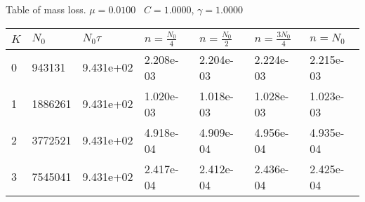 \begin{center}
Table of mass loss. $\mu = 0.0100$ \, $C = 1.0000$, $\gamma = 1.0000$
  
\begin{tabular}{|p{0.8in}|p{0.8in}|p{0.8in}|p{0.8in}|p{0.8in}|p{0.8in}|p{0.8in}|} \hline
$K$ &$N_0$ &$N_0 \tau$ &$n = \frac{N_0}{4}$ &$n = \frac{N_0}{2}$ &$n = \frac{3N_0}{4}$ &$n = N_0$ \\ \hline 
0 &943131 &9.431e+02 &2.208e-03 &2.204e-03 &2.224e-03 &2.215e-03 \\ \hline 
1 &1886261 &9.431e+02 &1.020e-03 &1.018e-03 &1.028e-03 &1.023e-03 \\ \hline 
2 &3772521 &9.431e+02 &4.918e-04 &4.909e-04 &4.956e-04 &4.935e-04 \\ \hline 
3 &7545041 &9.431e+02 &2.417e-04 &2.412e-04 &2.436e-04 &2.425e-04 \\ \hline 

\end{tabular}\\[20pt]
\end{center}

